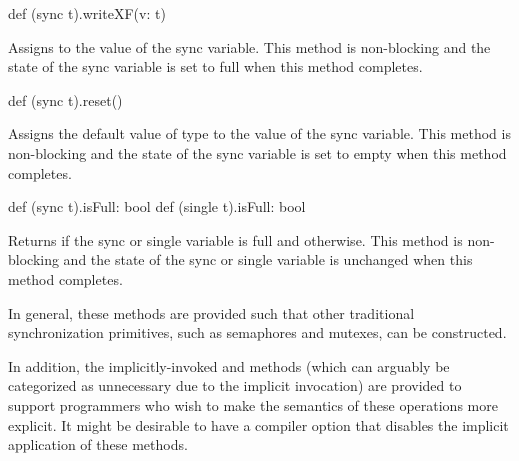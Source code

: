 \begin{protohead}
def (sync t).writeXF(v: t)
\end{protohead}
\begin{protobody}
Assigns  to the value of the sync variable.  This method is
non-blocking and the state of the sync variable is set to full when
this method completes.
\end{protobody}

\begin{protohead}
def (sync t).reset()
\end{protohead}
\begin{protobody}
Assigns the default value of type  to the value of the sync
variable.  This method is non-blocking and the state of the sync
variable is set to empty when this method completes.
\end{protobody}

\begin{protohead}
def (sync t).isFull: bool
def (single t).isFull: bool
\end{protohead}
\begin{protobody}
Returns  if the sync or single variable is full and 
otherwise.  This method is non-blocking and the state of the sync or single
variable is unchanged when this method completes.
\end{protobody}

\begin{rationale}
In general, these methods are provided such that other traditional
synchronization primitives, such as semaphores and mutexes, can be
constructed.

In addition, the implicitly-invoked  and 
methods (which can arguably be categorized as unnecessary due to the
implicit invocation) are provided to support programmers who wish to
make the semantics of these operations more explicit.  It might be
desirable to have a compiler option that disables the implicit
application of these methods.
\end{rationale}

